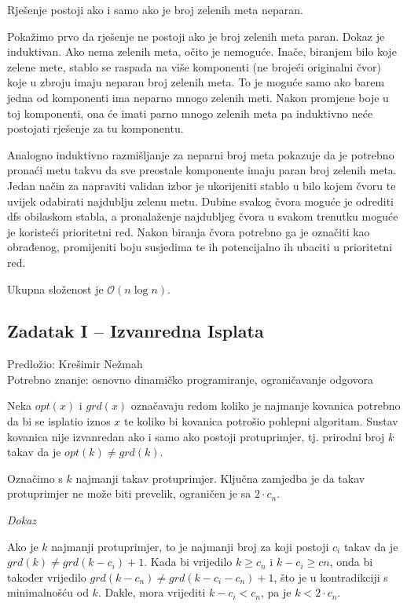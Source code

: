 \documentclass[a4paper]{article}
\begin{document}
Rješenje postoji ako i samo ako je broj zelenih meta neparan.

Pokažimo prvo da rješenje ne postoji ako je broj zelenih meta paran. Dokaz je
induktivan. Ako nema zelenih meta, očito je nemoguće. Inače, biranjem bilo koje
zelene mete, stablo se raspada na više komponenti (ne brojeći originalni čvor)
koje u zbroju imaju neparan broj zelenih meta. To je moguće samo ako barem
jedna od komponenti ima neparno mnogo zelenih meti. Nakon promjene boje u toj
komponenti, ona će imati parno mnogo zelenih meta pa induktivno neće postojati
rješenje za tu komponentu.

Analogno induktivno razmišljanje za neparni broj meta pokazuje da je potrebno
pronaći metu takvu da sve preostale komponente imaju paran broj zelenih meta.
Jedan način za napraviti validan izbor je ukorijeniti stablo u bilo kojem čvoru
te uvijek odabirati najdublju zelenu metu. Dubine svakog čvora moguće je
odrediti dfs obilaskom stabla, a pronalaženje najdubljeg čvora u svakom
trenutku moguće je koristeći prioritetni red. Nakon biranja čvora potrebno ga je
označiti kao obrađenog, promijeniti boju susjedima te ih potencijalno ih ubaciti u
prioritetni red.

Ukupna složenost je $\mathcal{O}(n \log n)$.

\subsection*{Zadatak I -- Izvanredna Isplata}
\textsf{Predložio: Krešimir Nežmah}\\
\textsf{Potrebno znanje: osnovno dinamičko programiranje, ograničavanje odgovora}

Neka $opt(x)$ i $grd(x)$ označavaju redom koliko je najmanje kovanica potrebno
da bi se isplatio iznos $x$ te koliko bi kovanica potrošio pohlepni algoritam.
Sustav kovanica nije izvanredan ako i samo ako postoji protuprimjer, tj.
prirodni broj $k$ takav da je $opt(k) \ne grd(k)$.

Označimo s $k$ najmanji takav protuprimjer. Ključna zamjedba je da takav
protuprimjer ne može biti prevelik, ograničen je sa $2 \cdot c_n$.

\textit{Dokaz}

Ako je $k$ najmanji protuprimjer, to je najmanji broj za koji postoji $c_i$
takav da je $grd(k) \ne grd(k - c_i) + 1$. Kada bi vrijedilo $k \ge c_n$ i $k -
c_i \ge cn$, onda bi također vrijedilo $grd(k - c_n) \ne grd(k - c_i - c_n) +
1$, što je u kontradikciji s minimalnošću od $k$. Dakle, mora vrijediti $k -
c_i < c_n$, pa je $k < 2 \cdot c_n$.
\end{document}
